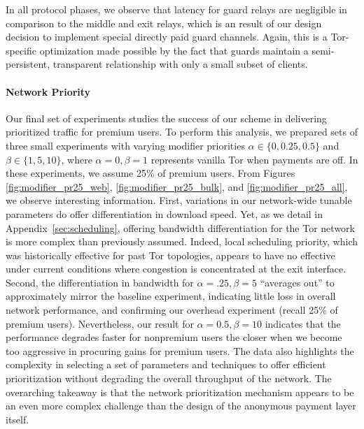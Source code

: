 In all protocol phases, we observe that latency for guard relays are negligible
in comparison to the middle and exit relays, which is an result of our design
decision to implement special directly paid guard channels. Again, this is a
Tor-specific optimization made possible by the fact that guards maintain a
semi-persistent, transparent relationship with only a small subset of clients.

\paragraph*{Network Priority}
\label{sec:priority_exp}
Our final set of experiments studies the success of our scheme in delivering
prioritized traffic for premium users. To perform this analysis, we prepared
sets of three small experiments with varying modifier priorities $\alpha \in
\{0, 0.25, 0.5\}$ and $\beta \in \{1, 5, 10\}$, where $\alpha = 0, \beta = 1$
represents vanilla Tor when payments are off. In these experiments, we assume
25\% of premium users. From Figures \ref{fig:modifier_pr25_web},
\ref{fig:modifier_pr25_bulk}, and \ref{fig:modifier_pr25_all}, we observe
interesting information. First, variations in our network-wide tunable
parameters do offer differentiation in download speed. Yet, as we detail in
Appendix~\ref{sec:scheduling}, offering bandwidth differentiation for the Tor
network is more complex than previously assumed. Indeed, local scheduling
priority, which was historically effective for past Tor topologies, appears to
have no effective under current conditions where congestion is concentrated at
the exit interface. Second, the differentiation in bandwidth for $\alpha = .25,
\beta=5$ ``averages out'' to approximately mirror the baseline experiment,
indicating little loss in overall network performance, and confirming our
overhead experiment (recall 25\% of premium users). Nevertheless, our result for
$\alpha = 0.5, \beta=10$ indicates that the performance degrades faster for
nonpremium users the closer when we become too aggressive in procuring gains for
premium users. The data also highlights the complexity in selecting a set of
parameters and techniques to offer efficient prioritization without degrading
the overall throughput of the network. The overarching takeaway is that the
network prioritization mechanism appears to be an even more complex challenge
than the design of the anonymous payment layer itself.


